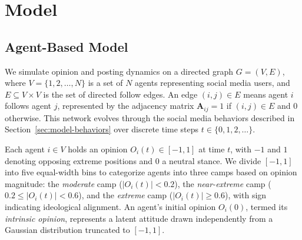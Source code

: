 \documentclass{svproc}
\begin{document}

\section{Model}\label{sec:model}
\subsection{Agent-Based Model}\label{sec:model-abm}
We simulate opinion and posting dynamics on a directed graph
$G=(V,E)$, where $V=\{1,2,\dots,N\}$ is a set of $N$ agents
representing social media users, and $E\subseteq V\times V$ is the set
of directed follow edges. An edge $(i,j)\in E$ means agent $i$ follows
agent $j$, represented by the adjacency matrix $\mathbf{A}_{ij}=1$ if
$(i,j)\in E$ and $0$ otherwise. This network evolves through the
social media behaviors described in Section~\ref{sec:model-behaviors}
over discrete time steps $t\in\{0,1,2,\dots\}$.
\par


Each agent $i\in V$ holds an opinion $O_i(t)\in[-1,1]$ at time $t$,
with $-1$ and $1$ denoting opposing extreme positions and $0$ a
neutral stance. We divide $[-1,1]$ into five equal-width bins to
categorize agents into three camps based on opinion magnitude: the
\emph{moderate} camp ($\vert O_i(t)\vert <0.2$), the
\emph{near-extreme} camp ($0.2\le\vert O_i(t)\vert<0.6$), and the
\emph{extreme} camp ($\vert O_i(t)\vert\ge0.6$), with sign indicating
ideological alignment. An agent's initial opinion $O_i(0)$, termed its
\emph{intrinsic opinion}, represents a latent attitude drawn
independently from a Gaussian distribution truncated to $[-1,1]$.
\par
\end{document}
